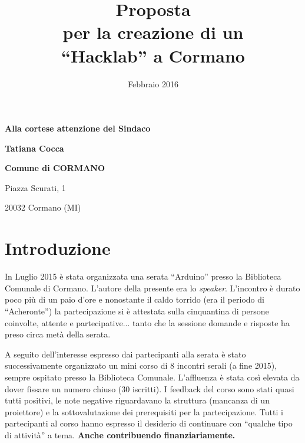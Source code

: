 \documentclass[a4paper,12pt]{article}
\title{\textbf{Proposta\\
per la creazione di un\\
``Hacklab'' a Cormano}}
\date{Febbraio 2016}
\begin{document}
\maketitle
\thispagestyle{fancy}

\hspace{.40\textwidth}\textbf{Alla cortese attenzione del Sindaco}

\hspace{.40\textwidth}\textbf{Tatiana Cocca}




\medskip

\hspace{.50\textwidth}\textbf{Comune di CORMANO}

\hspace{.50\textwidth}Piazza Scurati, 1

\hspace{.50\textwidth}20032 Cormano (MI)





\section*{Introduzione}

In Luglio 2015 è stata organizzata una serata ``Arduino'' presso la Biblioteca 
Comunale di Cormano. L'autore della presente era lo \textit{speaker}.
L'incontro è durato poco più di un paio d'ore e nonostante il caldo torrido 
(era il periodo di ``Acheronte'') la partecipazione si è attestata sulla 
cinquantina di persone coinvolte, attente e partecipative... tanto che la 
sessione domande e risposte ha preso circa metà della serata.

A seguito dell'interesse espresso dai partecipanti alla serata è stato successivamente organizzato un mini corso di 8 incontri serali (a fine 2015), sempre ospitato presso la Biblioteca Comunale. L'affluenza è stata così elevata da dover fissare un numero chiuso (30 iscritti).
I feedback del corso sono stati quasi tutti positivi, le note negative riguardavano la struttura (mancanza di un proiettore) e la sottovalutazione dei prerequisiti per la partecipazione.
Tutti i partecipanti al corso hanno espresso il desiderio di continuare con ``qualche tipo di attività'' a tema.
\textbf{Anche contribuendo finanziariamente.}
\end{document}
